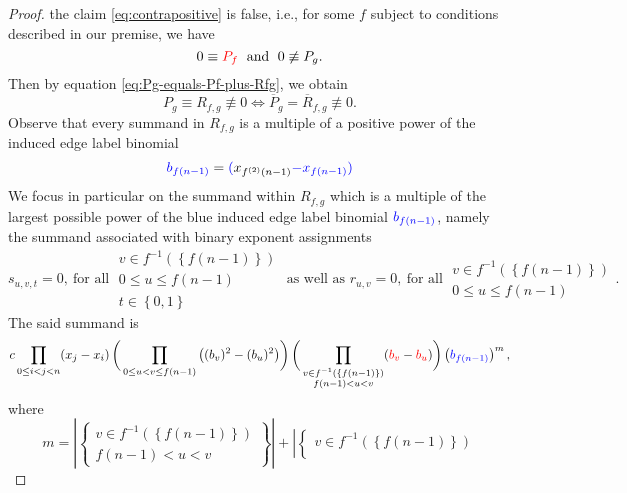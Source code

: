 \begin{proof}
the claim \eqref{eq:contrapositive} is false, i.e., for some $f$ subject to conditions
described in our premise, we have
\begin{equation}
0\equiv{\color{red}{\color{red}P_{f}}}\;\text{ and }\;0\not\equiv P_{g}.
\end{equation}
Then by equation \eqref{eq:Pg-equals-Pf-plus-Rfg}, we obtain
\begin{equation}\label{eq:premise}
P_{g}\equiv R_{f,g}\not\equiv0\Longleftrightarrow \overline{P}_{g}=\overline{R}_{f,g}\not\equiv0 .
\end{equation}
Observe that every summand in $R_{f,g}$ is a multiple of a positive
power of the induced edge label binomial
\[
{\color{blue}b_{f(n-1)}} = {\color{blue}(}x_{f^{\left(2\right)}\left(n-1\right)}{\color{blue}-x_{f\left(n-1\right)})}
\]
We focus in particular on the summand within $R_{f,g}$ which is
a multiple of the largest possible power of the blue induced edge label binomial ${\color{blue}b_{f(n-1)}}$,
namely the summand associated with binary exponent assignments
\begin{equation}
s_{u,v,t}=0,\ \text{for all}\;\begin{array}{c}
v\in f^{-1}\left(\left\{ f\left(n-1\right)\right\} \right)\\
0\le u\le f\left(n-1\right)\\
t\in\left\{ 0,1\right\} 
\end{array}\text{ as well as }r_{u,v}=0,\ \text{for all}\;\begin{array}{c}
v\in f^{-1}\left(\left\{ f\left(n-1\right)\right\} \right)\\
0\le u\le f\left(n-1\right)
\end{array}.
\end{equation}
The said summand is
\[
c\,\underset{0\le i<j<n}{\prod}(x_{j}-x_{i})\,\bigg(\prod_{0\le u<v\le f\left(n-1\right)}\big((b_{v})^{2}-(b_{u})^{2}\big)\bigg)\,\bigg(\prod_{\substack{v\in f^{-1}\left(\left\{ f\left(n-1\right)\right\} \right)\\
f\left(n-1\right)<u<v
}
}({\color{red}b_{v}}-{\color{red}b_{u}})\bigg)\left({\color{blue}b_{f\left(n-1\right)}}\right)^{m},
\]
where
\begin{equation}
m=\left|\left\{ \begin{array}{c}
v\in f^{-1}\left(\left\{ f\left(n-1\right)\right\} \right)\\
f\left(n-1\right)<u<v
\end{array}\right\} \right|+\left|\left\{ \begin{array}{c}
v\in f^{-1}\left(\left\{ f\left(n-1\right)\right\} \right)\\

\end{array}
\end{equation}
\end{proof}
